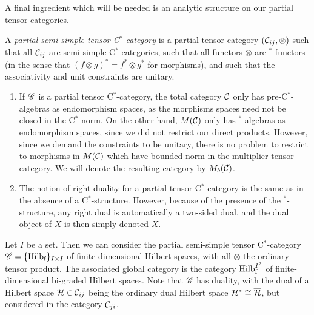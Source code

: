 A final ingredient which will be needed is an analytic structure on our partial tensor categories.

\begin{Def} A \emph{partial semi-simple tensor C$^*$-category} is a partial tensor category $(\mathcal{C}_{ij},\otimes)$ such that all $\mathcal{C}_{ij}$ are semi-simple C$^*$-categories, such that all functors $\otimes$ are $^*$-functors (in the sense that $(f\otimes g)^* = f^*\otimes g^*$ for morphisms), and such that the associativity and unit constraints are unitary.
\end{Def} 



\begin{Rem}
\begin{enumerate}
\item If $\mathscr{C}$ is a partial tensor C$^*$-category, the total category $\mathcal{C}$ only has pre-C$^*$-algebras as endomorphism spaces, as the morphisms spaces need not be closed in the C$^*$-norm. On the other hand, $M(\mathcal{C})$ only has $^*$-algebras as endomorphism spaces, since we did not restrict our direct products. However, since we demand the constraints to be unitary, there is no problem to restrict to morphisms in $M(\mathcal{C})$ which have bounded norm in the multiplier tensor category. We will denote the resulting category by $M_b(\mathcal{C})$. %
\item The notion of right duality for a partial tensor C$^*$-category is the same as in the absence of a C$^*$-structure. However, because of the presence of the $^*$-structure, any right dual is automatically a two-sided dual, and the dual object of $X$ is then simply denoted $\overline{X}$.  
\end{enumerate}
\end{Rem}

\begin{Exa} Let $I$ be a set. Then we can consider the partial semi-simple tensor C$^*$-category $\mathscr{C} = \{\mathrm{Hilb}_{\operatorname{\mathrm{f}}}\}_{I\times I}$ of finite-dimensional Hilbert spaces, with all $\otimes$ the ordinary tensor product. The associated global category is the category $\mathrm{Hilb}^{I^{2}}_{\mathrm{f}}$ of finite-dimensional bi-graded Hilbert spaces. Note that $\mathscr{C}$ has duality, with the dual of a Hilbert space $\mathcal{H} \in \mathcal{C}_{ij}$ being the ordinary dual Hilbert space $\mathcal{H}^* \cong \overline{\mathcal{H}}$, but considered in the category $\mathcal{C}_{ji}$. 
\end{Exa}

